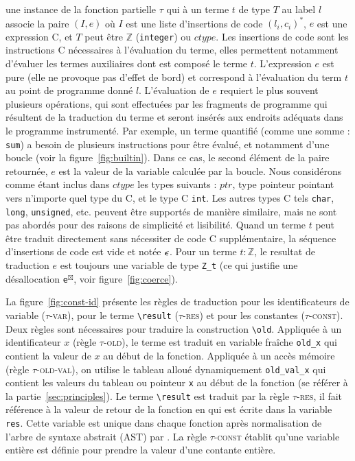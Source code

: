 une instance de la fonction partielle $\tau$ qui à un terme \eacsl $t$ de type
$T$ au label $l$ associe la paire $(I, e)$ où $I$ est une liste d'insertions de
code $(l_i, c_i)^*$, $e$ est une expression C, et $T$ peut être $\mathbb{Z}$
(\lstinline'integer') ou $ctype$.
Les insertions de code sont les instructions C nécessaires à l'évaluation du
terme, elles permettent notamment d'évaluer les termes auxiliaires dont est
composé le terme $t$.
L'expression $e$ est pure (elle ne provoque pas d'effet de bord) et correspond
à l'évaluation du term $t$ au point de programme donné $l$.
L'évaluation de $e$ requiert le plus souvent plusieurs opérations, qui sont
effectuées par les fragments de programme qui résultent de la traduction du
terme et seront insérés aux endroits adéquats dans le programme instrumenté.
Par exemple, un terme quantifié (comme une somme : \lstinline'sum') a besoin de
plusieurs instructions pour être évalué, et notamment d'une boucle (voir la
figure~\ref{fig:builtin}).
Dans ce cas, le second élément de la paire retournée, $e$ est la valeur de la
variable calculée par la boucle.
Nous considérons comme étant inclus dans $ctype$ les types suivants : $ptr$,
type pointeur pointant vers n'importe quel type du C, et le type C
\lstinline'int'.
Les autres types C tels \lstinline'char', \lstinline'long',
\lstinline'unsigned', etc. peuvent être supportés de manière similaire, mais ne
sont pas abordés pour des raisons de simplicité et lisibilité.
Quand un terme $t$ peut être traduit directement sans nécessiter de code C
supplémentaire, la séquence d'insertions de code est vide et notée $\epsilon$.
Pour un terme $t:\mathbb{Z}$, le resultat de traduction $e$ est toujours une
variable de type \lstinline'Z_t' (ce qui justifie une désallocation
\lstinline{e}${}^{\boxtimes}$, voir figure~\ref{fig:coerce}).

La figure~\ref{fig:const-id} présente les règles de traduction pour les
identificateurs de variable (\textsc{$\tau$-var}), pour le terme
\lstinline|\result| (\textsc{$\tau$-res}) et pour les constantes
(\textsc{$\tau$-const}).
Deux règles sont nécessaires pour traduire la construction \eacsl
\lstinline|\old|.
Appliquée à un identificateur $x$ (règle \textsc{$\tau$-old}), le terme est
traduit en variable fraîche \lstinline|old_x| qui contient la valeur de $x$ au
début de la fonction.
Appliquée à un accès mémoire (règle \textsc{$\tau$-old-val}), on utilise le
tableau alloué dynamiquement \lstinline|old_val_x| qui contient les valeurs du
tableau ou pointeur \lstinline'x' au début de la fonction (se référer à la
partie~\ref{sec:principles}).
Le terme \lstinline|\result| est traduit par la règle \textsc{$\tau$-res}, il
fait référence à la valeur de retour de la fonction en \eacsl qui est écrite
dans la variable \lstinline|res|.
Cette variable est unique dans chaque fonction après normalisation de l'arbre de
syntaxe abstrait (AST) par \framac.
La règle \textsc{$\tau$-const} établit qu'une variable entière est définie pour
prendre la valeur d'une contante entière.

